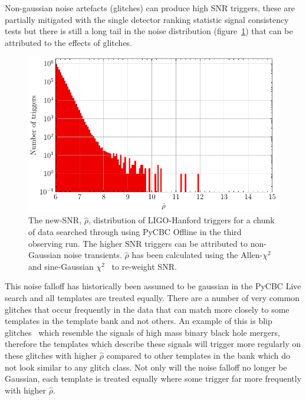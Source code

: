 Non-gaussian noise artefacts (glitches) can produce high SNR triggers, these are partially mitigated with the single detector ranking statistic signal consistency tests but there is still a long tail in the noise distribution (figure~\ref{5:fig:H1_long_tails}) that can be attributed to the effects of glitches.
%
\begin{figure}
    \centering
    \includegraphics[width=1.0\linewidth]{images/5_pycbclive/H1-newsnr_trigs.pdf}
    \caption{The new-SNR, $\hat{\rho}$, distribution of LIGO-Hanford triggers for a chunk of data searched through using PyCBC Offline in the third observing run. The higher SNR triggers can be attributed to non-Gaussian noise transients. $\hat{\rho}$ has been calculated using the Allen-$\chi^{2}$~\cite{Allen_Chi:2005} and sine-Gaussian $\chi^{2}$~\cite{PyCBC_sg:2018} to re-weight SNR.}
    \label{5:fig:H1_long_tails}
\end{figure}
%
This noise falloff has historically been assumed to be gaussian in the PyCBC Live search and all templates are treated equally. There are a number of very common glitches that occur frequently in the data that can match more closely to some templates in the template bank and not others. An example of this is blip glitches~\cite{blips:2019} which resemble the \gwadj signals of high mass binary black hole mergers, therefore the templates which describe these signals will trigger more regularly on these glitches with higher $\hat{\rho}$ compared to other templates in the bank which do not look similar to any glitch class. Not only will the noise falloff no longer be Gaussian, each template is treated equally where some trigger far more frequently with higher $\hat{\rho}$.

